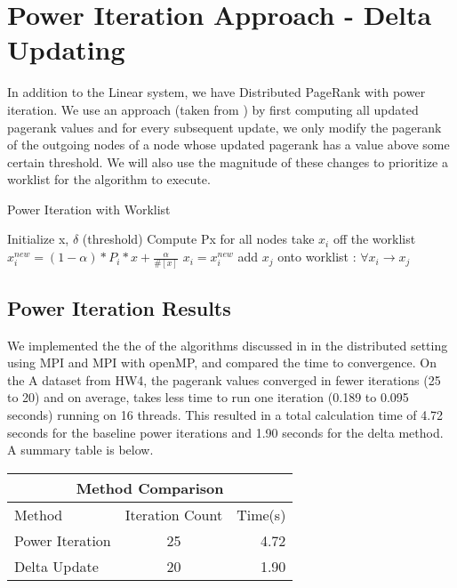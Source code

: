\documentclass[letterpaper,12pt,onecolumn]{article}
\begin{document}
\section{Power Iteration Approach - Delta Updating}
In addition to the Linear system, we have Distributed PageRank with power iteration. We use an approach (taken from \cite{Joyce}) by first computing all updated pagerank values and for every subsequent update, we only modify the pagerank of the outgoing nodes of a node whose updated pagerank has a value above some certain threshold. We will also use the magnitude of these changes to prioritize a worklist for the algorithm to execute. 
\newline
\begin{algorithm}
\caption{Power Iteration with Worklist}
\begin{algorithmic}[1]
  \STATE Initialize x, $\delta$ (threshold)
  \STATE Compute Px for all nodes
    \STATE take $x_{i}$ off the worklist
	\STATE $x_{i}^{new} = (1-\alpha)*P_{i}*x + \frac{\alpha}{\#[x]}$
		\STATE $x_{i} = x_{i}^{new}$
		\STATE add $x_{j}$ onto worklist : $\forall x_{i} \to x_{j}$
	\ENDIF
  \ENDIF
  \ENDWHILE
\end{algorithmic}
\end{algorithm}
\newline

\subsection{Power Iteration Results}
We implemented the the of the algorithms discussed in \cite{Joyce} in the distributed setting using MPI and MPI with openMP, and compared the time to convergence. On the A dataset from HW4, the pagerank values converged in fewer iterations (25 to 20) and on average, takes less time to run one iteration (0.189 to 0.095 seconds) running on 16 threads. This resulted in a total calculation time of 4.72 seconds for the baseline power iterations and 1.90 seconds for the delta method. A summary table is below.

\begin{center}
\begin{tabular}{l || c | r}
	\hline
	\multicolumn{3}{c}{Method Comparison} \\
	\hline\hline
	Method & Iteration Count & Time(s) \\
	\hline\hline
	Power Iteration & 25 & 4.72 \\
	Delta Update & 20 & 1.90 \\
\end{tabular}
\end{center}
\end{document}
